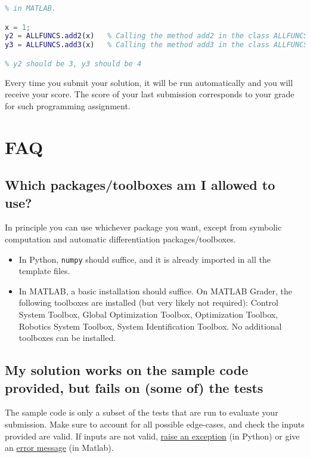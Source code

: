 \documentclass[11pt, reqno]{amsart} %
\begin{document}
\begin{lstlisting}[language=MATLAB, frame=single, caption=Example main.m .\\]
% Example on using static methods
% in MATLAB.

x = 1;
y2 = ALLFUNCS.add2(x)   % Calling the method add2 in the class ALLFUNCS
y3 = ALLFUNCS.add3(x)   % Calling the method add3 in the class ALLFUNCS

% y2 should be 3, y3 should be 4
\end{lstlisting}

\noindent
Every time you submit your solution, it will be run automatically and you will receive your score.
The score of your last submission corresponds to your grade for such programming assignment.

\section{FAQ}

\subsection{Which packages/toolboxes am I allowed to use?}
In principle you can use whichever package you want, except from symbolic computation and automatic differentiation packages/toolboxes.
\begin{itemize}
    \item In Python, \texttt{numpy} should suffice, and it is already imported in all the template files.
    \item In MATLAB, a basic installation should suffice.
    On MATLAB Grader, the following toolboxes are installed (but very likely not required): Control System Toolbox, Global Optimization Toolbox, Optimization Toolbox, Robotics System Toolbox, System Identification Toolbox.
    No additional toolboxes can be installed.
\end{itemize}

\subsection{My solution works on the sample code provided, but fails on (some of) the tests}

The sample code is only a subset of the tests that are run to evaluate your submission.
Make sure to account for all possible edge-cases, and check the inputs provided are valid.
If inputs are not valid, \href{https://docs.python.org/3/tutorial/errors.html}{raise an exception} (in Python) or give an \href{https://www.mathworks.com/help/matlab/ref/error.html}{error message} (in Matlab).
\end{document}
